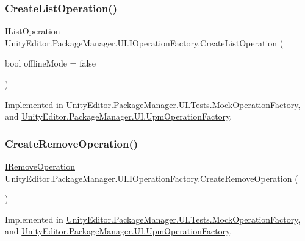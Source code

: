 \subsubsection{\texorpdfstring{CreateListOperation()}{CreateListOperation()}}
{\footnotesize\ttfamily \mbox{\hyperlink{interface_unity_editor_1_1_package_manager_1_1_u_i_1_1_i_list_operation}{I\+List\+Operation}} Unity\+Editor.\+Package\+Manager.\+U\+I.\+I\+Operation\+Factory.\+Create\+List\+Operation (\begin{DoxyParamCaption}\item[{bool}]{offline\+Mode = {\ttfamily false} }\end{DoxyParamCaption})}



Implemented in \mbox{\hyperlink{class_unity_editor_1_1_package_manager_1_1_u_i_1_1_tests_1_1_mock_operation_factory_a23ac4569326a62c4913e285446e6e933}{Unity\+Editor.\+Package\+Manager.\+U\+I.\+Tests.\+Mock\+Operation\+Factory}}, and \mbox{\hyperlink{class_unity_editor_1_1_package_manager_1_1_u_i_1_1_upm_operation_factory_ac7d8532219c1ee8dbb59a15175d5944a}{Unity\+Editor.\+Package\+Manager.\+U\+I.\+Upm\+Operation\+Factory}}.

\mbox{\label{interface_unity_editor_1_1_package_manager_1_1_u_i_1_1_i_operation_factory_aa8a45874d7de57734cf4d7591b07c561}} 
\subsubsection{\texorpdfstring{CreateRemoveOperation()}{CreateRemoveOperation()}}
{\footnotesize\ttfamily \mbox{\hyperlink{interface_unity_editor_1_1_package_manager_1_1_u_i_1_1_i_remove_operation}{I\+Remove\+Operation}} Unity\+Editor.\+Package\+Manager.\+U\+I.\+I\+Operation\+Factory.\+Create\+Remove\+Operation (\begin{DoxyParamCaption}{ }\end{DoxyParamCaption})}



Implemented in \mbox{\hyperlink{class_unity_editor_1_1_package_manager_1_1_u_i_1_1_tests_1_1_mock_operation_factory_a548fecbf2178df4f76eba8308584766c}{Unity\+Editor.\+Package\+Manager.\+U\+I.\+Tests.\+Mock\+Operation\+Factory}}, and \mbox{\hyperlink{class_unity_editor_1_1_package_manager_1_1_u_i_1_1_upm_operation_factory_ab996d83fd2c343c982c264fdf046ab90}{Unity\+Editor.\+Package\+Manager.\+U\+I.\+Upm\+Operation\+Factory}}.

